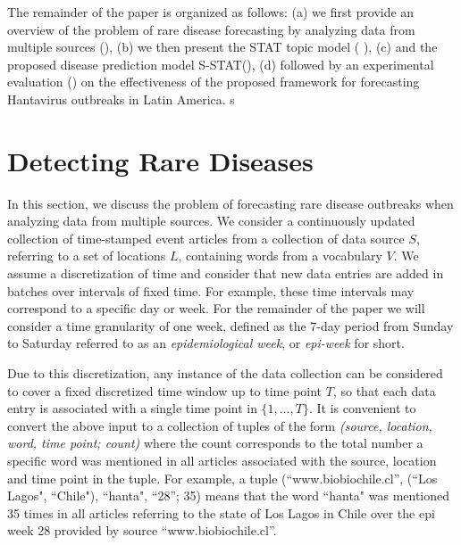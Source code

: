 \documentclass[conference]{IEEEtran}
\newcommand{\model}{{STAT}\xspace} %
\newcommand{\fullmodel}{{S-STAT}\xspace}
\begin{document}
The remainder of the paper is organized as follows: (a) we first provide an overview of the problem of rare disease forecasting by analyzing data from multiple sources (), (b) we then present the \model topic model ( ), (c) and the proposed disease prediction model \fullmodel (), (d) followed by an experimental evaluation () on the effectiveness of the proposed framework for forecasting Hantavirus outbreaks in Latin America. 
s
\section{Detecting Rare Diseases}
\label{sec:problem}
In this section, we discuss the problem of forecasting rare disease outbreaks when analyzing data from multiple sources. We consider a continuously updated collection of time-stamped event articles from a collection of data source $S$, referring to a set of locations $L$, containing words from a vocabulary $V$. We assume a discretization of time and consider that new data entries are added in batches over intervals of fixed time. For example, these time intervals may correspond to a specific day or week. For the remainder of the paper we will consider a time granularity of one week, defined as the 7-day period from Sunday to Saturday referred to as an {\em epidemiological week}, or {\em epi-week} for short. 

Due to this discretization, any instance of the data collection can be considered to cover a fixed discretized time window up to time point $T$, so that each data entry is associated with a single time point in $\{1, \dots,T\}$. It is convenient to convert the above input to a collection of tuples of the form {\em (source, location, word, time point; count)} where the count corresponds to the total number a specific word was mentioned in all articles associated with the source, location and time point in the tuple. For example, a tuple (``www.biobiochile.cl'', (``Los Lagos", ``Chile"), ``hanta", ``28''; 35) means that the word ``hanta" was mentioned 35 times in all articles referring to the state of Los Lagos in Chile over the epi week 28 provided by source ``www.biobiochile.cl''.  
\end{document}
